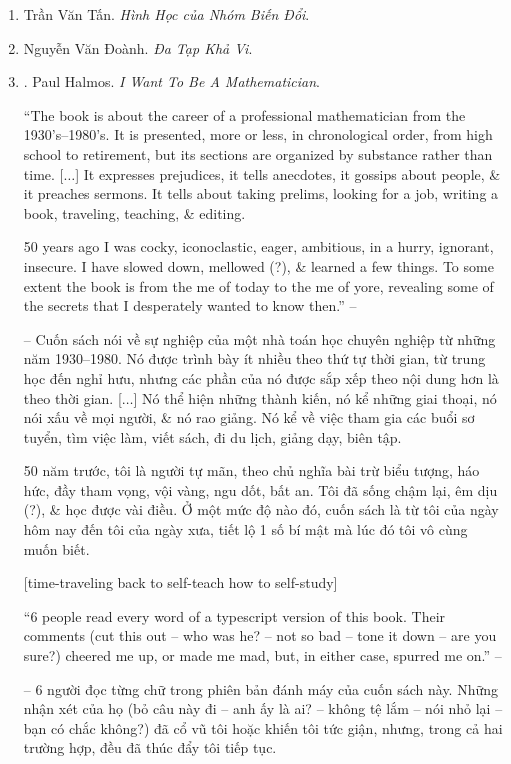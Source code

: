 \documentclass{article}
\begin{document}
\begin{enumerate}
	\item Trần Văn Tấn. {\it Hình Học của Nhóm Biến Đổi}.
	
	\item Nguyễn Văn Đoành. {\it Đa Tạp Khả Vi}.
	
	\item \cite{Halmos1985}. {\sc Paul Halmos}. {\it I Want To Be A Mathematician}.
	
	``The book is about the career of a professional mathematician from the 1930's--1980's. It is presented, more or less, in chronological order, from high school to retirement, but its sections are organized by substance rather than time. [$\ldots$] It expresses prejudices, it tells anecdotes, it gossips about people, \& it preaches sermons. It tells about taking prelims, looking for a job, writing a book, traveling, teaching, \& editing.
	
	50 years ago I was cocky, iconoclastic, eager, ambitious, in a hurry, ignorant, insecure. I have slowed down, mellowed (?), \& learned a few things. To some extent the book is from the me of today to the me of yore, revealing some of the secrets that I desperately wanted to know then.'' -- \cite[Overture]{Halmos1985}
	
	-- Cuốn sách nói về sự nghiệp của một nhà toán học chuyên nghiệp từ những năm 1930--1980. Nó được trình bày ít nhiều theo thứ tự thời gian, từ trung học đến nghỉ hưu, nhưng các phần của nó được sắp xếp theo nội dung hơn là theo thời gian. [$\ldots$] Nó thể hiện những thành kiến, nó kể những giai thoại, nó nói xấu về mọi người, \& nó rao giảng. Nó kể về việc tham gia các buổi sơ tuyển, tìm việc làm, viết sách, đi du lịch, giảng dạy, biên tập.
	
	50 năm trước, tôi là người tự mãn, theo chủ nghĩa bài trừ biểu tượng, háo hức, đầy tham vọng, vội vàng, ngu dốt, bất an. Tôi đã sống chậm lại, êm dịu (?), \& học được vài điều. Ở một mức độ nào đó, cuốn sách là từ tôi của ngày hôm nay đến tôi của ngày xưa, tiết lộ 1 số bí mật mà lúc đó tôi vô cùng muốn biết. 
	
	[time-traveling back to self-teach how to self-study]
	
	``6 people read every word of a typescript version of this book. Their comments (cut this out -- who was he? -- not so bad -- tone it down -- are you sure?) cheered me up, or made me mad, but, in either case, spurred me on.'' -- \cite[Thanks]{Halmos1985}
	
	-- 6 người đọc từng chữ trong phiên bản đánh máy của cuốn sách này. Những nhận xét của họ (bỏ câu này đi -- anh ấy là ai? -- không tệ lắm -- nói nhỏ lại -- bạn có chắc không?) đã cổ vũ tôi hoặc khiến tôi tức giận, nhưng, trong cả hai trường hợp, đều đã thúc đẩy tôi tiếp tục.
	

\end{enumerate}
\end{document}
